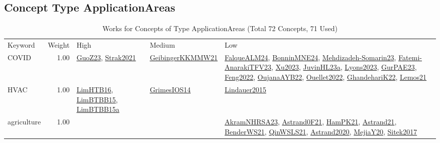 \subsection{Concept Type ApplicationAreas}
\label{sec:ApplicationAreas}
\label{ApplicationAreas}
{\scriptsize
\begin{longtable}{p{3cm}r>{\raggedright\arraybackslash}p{6cm}>{\raggedright\arraybackslash}p{6cm}>{\raggedright\arraybackslash}p{8cm}}
\rowcolor{white}\caption{Works for Concepts of Type ApplicationAreas (Total 72 Concepts, 71 Used)}\\ \toprule
\rowcolor{white}Keyword & Weight & High & Medium & Low\\ \midrule\endhead
\bottomrule
\endfoot
\index{COVID}\index{ApplicationAreas!COVID}COVID &  1.00 & \hyperref[detail:GuoZ23]{GuoZ23}, \hyperref[detail:Strak2021]{Strak2021} & \hyperref[detail:GeibingerKKMMW21]{GeibingerKKMMW21} & \hyperref[detail:FalqueALM24]{FalqueALM24}, \hyperref[detail:BonninMNE24]{BonninMNE24}, \hyperref[detail:Mehdizadeh-Somarin23]{Mehdizadeh-Somarin23}, \hyperref[detail:Fatemi-AnarakiTFV23]{Fatemi-AnarakiTFV23}, \hyperref[detail:Xu2023]{Xu2023}, \hyperref[detail:JuvinHL23a]{JuvinHL23a}, \hyperref[detail:Lyons2023]{Lyons2023}, \hyperref[detail:GurPAE23]{GurPAE23}, \hyperref[detail:Feng2022]{Feng2022}, \hyperref[detail:OujanaAYB22]{OujanaAYB22}, \hyperref[detail:Ouellet2022]{Ouellet2022}, \hyperref[detail:GhandehariK22]{GhandehariK22}, \hyperref[detail:Lemos21]{Lemos21}\\
\index{HVAC}\index{ApplicationAreas!HVAC}HVAC &  1.00 & \hyperref[detail:LimHTB16]{LimHTB16}, \hyperref[detail:LimBTBB15]{LimBTBB15}, \hyperref[detail:LimBTBB15a]{LimBTBB15a} & \hyperref[detail:GrimesIOS14]{GrimesIOS14} & \hyperref[detail:Lindauer2015]{Lindauer2015}\\
\index{agriculture}\index{ApplicationAreas!agriculture}agriculture &  1.00 &  &  & \hyperref[detail:AkramNHRSA23]{AkramNHRSA23}, \hyperref[detail:Astrand0F21]{Astrand0F21}, \hyperref[detail:HamPK21]{HamPK21}, \hyperref[detail:Astrand21]{Astrand21}, \hyperref[detail:BenderWS21]{BenderWS21}, \hyperref[detail:QinWSLS21]{QinWSLS21}, \hyperref[detail:Astrand2020]{Astrand2020}, \hyperref[detail:MejiaY20]{MejiaY20}, \hyperref[detail:Sitek2017]{Sitek2017}\\

\end{longtable}}
